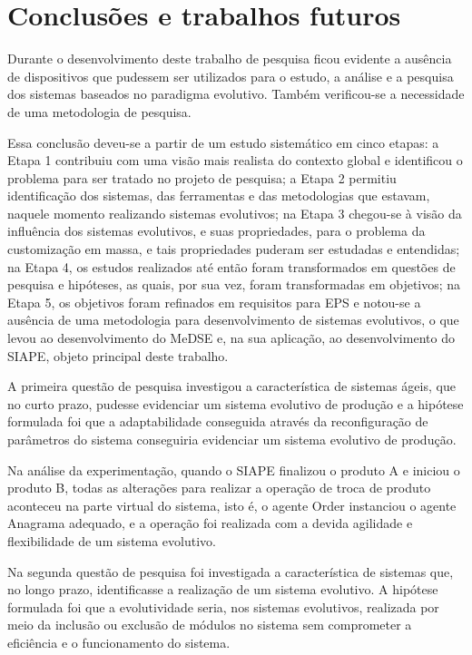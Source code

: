 	\chapter{Conclusões e trabalhos futuros}
	
	Durante o desenvolvimento deste trabalho de pesquisa ficou evidente a ausência de dispositivos que pudessem ser utilizados para o estudo, a análise e a pesquisa dos sistemas baseados no paradigma evolutivo. Também verificou-se a necessidade de uma metodologia de pesquisa.
	
	Essa conclusão deveu-se a partir de um estudo sistemático em cinco etapas: a Etapa 1 contribuiu com uma visão mais realista do contexto global e identificou o problema para ser tratado no projeto de pesquisa; a Etapa 2 permitiu identificação dos sistemas, das ferramentas e das metodologias que estavam, naquele momento realizando sistemas evolutivos; na Etapa 3 chegou-se à visão da influência dos sistemas evolutivos, e suas propriedades, para o problema da customização em massa, e tais propriedades puderam ser estudadas e entendidas; na Etapa 4, os estudos realizados até então foram transformados em questões de pesquisa e hipóteses, as quais, por sua vez, foram transformadas em objetivos; na Etapa 5, os objetivos foram refinados em requisitos para EPS e notou-se a ausência de uma metodologia para desenvolvimento de sistemas evolutivos, o que levou ao desenvolvimento do MeDSE e, na sua aplicação, ao desenvolvimento do SIAPE, objeto principal deste trabalho.
	
	A primeira questão de pesquisa investigou a característica de sistemas ágeis, que no curto prazo, pudesse evidenciar um sistema evolutivo de produção e a hipótese formulada foi que a adaptabilidade conseguida através da reconfiguração de parâmetros do sistema conseguiria evidenciar um sistema evolutivo de produção.
	
	Na análise da experimentação, quando o SIAPE finalizou o produto A e iniciou o produto B, todas as alterações para realizar a operação de troca de produto aconteceu na parte virtual do sistema, isto é, o agente Order instanciou o agente Anagrama adequado, e a operação foi realizada com a devida agilidade e flexibilidade de um sistema evolutivo.
	
	Na segunda questão de pesquisa foi investigada a característica de sistemas que, no longo prazo, identificasse a realização de um sistema evolutivo. A hipótese formulada foi que a evolutividade seria, nos sistemas evolutivos, realizada por meio da inclusão ou exclusão de módulos no sistema sem comprometer a eficiência e o funcionamento do sistema.
		

